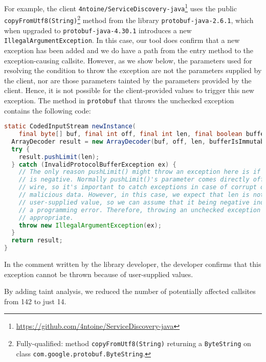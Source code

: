 For example, the client \texttt{4ntoine/ServiceDiscovery-java}\footnote{\url{https://github.com/4ntoine/ServiceDiscovery-java}} uses the public \texttt{copyFromUtf8(String)}\footnote{Fully-qualified: method \texttt{copyFromUtf8(String)} returning a \texttt{ByteString} on class \texttt{com.google.protobuf.ByteString}.} method
from the library \texttt{protobuf-java-2.6.1}, which when upgraded to \texttt{protobuf-java-4.30.1} introduces a new \texttt{IllegalArgumentException}. In this case, our tool
does confirm that a new exception has been added and we do have a path from the entry method to the exception-causing callsite. However, as we show below, the
parameters used for resolving the condition to throw the exception are not the parameters supplied by the client, nor
are those parameters tainted by the parameters provided by the client. Hence, it is not possible for the client-provided values
to trigger this new exception. The method in \texttt{protobuf} that throws the unchecked exception contains the following code:

\begin{lstlisting}[language=Java,breaklines=true,basicstyle=\scriptsize\ttfamily]
static CodedInputStream newInstance(
    final byte[] buf, final int off, final int len, final boolean bufferIsImmutable) {
  ArrayDecoder result = new ArrayDecoder(buf, off, len, bufferIsImmutable);
  try {
    result.pushLimit(len);
  } catch (InvalidProtocolBufferException ex) {
    // The only reason pushLimit() might throw an exception here is if len
    // is negative. Normally pushLimit()'s parameter comes directly off the
    // wire, so it's important to catch exceptions in case of corrupt or
    // malicious data. However, in this case, we expect that len is not a
    // user-supplied value, so we can assume that it being negative indicates
    // a programming error. Therefore, throwing an unchecked exception is
    // appropriate.
    throw new IllegalArgumentException(ex);
  }
  return result;
}
\end{lstlisting}

In the comment written by the library developer, the developer confirms that this exception cannot be thrown because of
user-supplied values.

\vspace{1em}
\begin{tcolorbox}[colback=gray!10, colframe=black]
By adding taint analysis, we reduced the number of potentially affected callsites from 142 to just 14.
\end{tcolorbox}
\vspace{1em}


